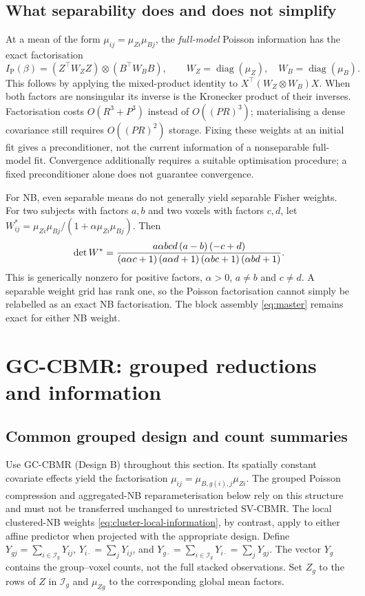 \documentclass[11pt,a4paper]{article}
\newcommand{\diag}{\operatorname{diag}}
\numberwithin{equation}{section}
\begin{document}
\subsection{What separability does and does not simplify}
At a mean of the form $\mu_{ij}=\mu_{Zi}\mu_{Bj}$, the \emph{full-model}
Poisson information has the exact factorisation
\begin{equation}\label{eq:kron-information}
 I_{\mathrm P}(\beta)
 =(Z^\top W_ZZ)\otimes(B^\top W_BB),\qquad
 W_Z=\diag(\mu_Z),\quad W_B=\diag(\mu_B).
\end{equation}
This follows by applying the mixed-product identity to
$X^\top(W_Z\otimes W_B)X$.
When both factors are nonsingular its inverse is the Kronecker product of
their inverses. Factorisation costs $O(R^3+P^3)$ instead of $O((PR)^3)$;
materialising a dense covariance still requires $O((PR)^2)$ storage.
Fixing these weights at an initial fit gives a preconditioner, not the
current information of a nonseparable full-model fit. Convergence additionally
requires a suitable optimisation procedure; a fixed preconditioner alone
does not guarantee convergence.

For NB, even separable means do not generally yield separable Fisher weights.
For two subjects with factors $a,b$ and two voxels with factors $c,d$, let
$W^*_{ij}=\mu_{Zi}\mu_{Bj}/(1+\alpha\mu_{Zi}\mu_{Bj})$. Then
\begin{equation}\label{eq:nonseparable}
 \det W^*=\frac{a \alpha b c d \left(a - b\right) \left(- c + d\right)}{\left(a \alpha c + 1\right) \left(a \alpha d + 1\right) \left(\alpha b c + 1\right) \left(\alpha b d + 1\right)}.
\end{equation}
This is generically nonzero for positive factors, $\alpha>0$, $a\ne b$ and
$c\ne d$. A separable weight grid has rank one, so the Poisson factorisation
cannot simply be relabelled as an exact NB factorisation. The block assembly
\eqref{eq:master} remains exact for either NB weight.

\section{GC-CBMR: grouped reductions and information}\label{sec:extensions}

\subsection{Common grouped design and count summaries}
Use GC-CBMR (Design B) throughout this section. Its spatially constant
covariate effects yield the factorisation
$\mu_{ij}=\mu_{B,g(i),j}\mu_{Zi}$.
The grouped Poisson compression and aggregated-NB reparameterisation
below rely on this structure and must not be transferred unchanged to
unrestricted SV-CBMR. The local clustered-NB weights
\eqref{eq:cluster-local-information}, by contrast, apply to either
affine predictor when projected with the appropriate design.
Define
$Y_{gj}=\sum_{i\in\mathcal I_g}Y_{ij}$,
$Y_{i\cdot}=\sum_jY_{ij}$, and
$Y_{g\cdot}=\sum_{i\in\mathcal I_g}Y_{i\cdot}=\sum_jY_{gj}$.
The vector $Y_g$ contains the group--voxel counts, not the full stacked
observations. Set $Z_g$ to the rows of $Z$ in $\mathcal I_g$ and
$\mu_{Zg}$ to the corresponding global mean factors.
\end{document}
